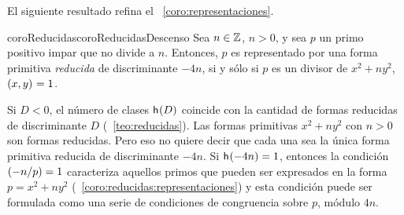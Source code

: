 El siguiente resultado refina el \coroname~\ref{coro:representaciones}.

\begin{restatable}{coroReducidas}{coroReducidasDescenso}
	\label{coro:reducidas:representaciones}
	Sea $n\in\mathbb{Z}$, $n>0$, y sea $p$ un primo positivo impar
	que no divide a $n$. Entonces, $p$ es representado por una
	forma primitiva \emph{reducida} de discriminante $-4n$,
	si y s\'olo si $p$ es un divisor de $x^2+ny^2$, $\left({x,y}\right)_{}=1$.
\end{restatable}


\begin{obsReducidas}\label{obs:reducidas}
	Si $D<0$, el n\'umero de clases $\mathsf{h}_{}(D)$ coincide
	con la cantidad de formas reducidas de discriminante $D$
	(\teoname~\ref{teo:reducidas}).
	Las formas primitivas $x^2+ny^2$ con $n>0$ son formas
	reducidas. Pero eso no quiere decir que cada una sea la
	\'unica forma primitiva reducida de discriminante $-4n$.
	Si $\mathsf{h}_{}(-4n)=1$, entonces la condici\'on
	$\left({-n}/{p}\right)=1$ caracteriza aquellos primos que
	pueden ser expresados en la forma $p=x^2+ny^2$
	(\coroname~\ref{coro:reducidas:representaciones})
	y esta condici\'on puede ser formulada como una serie de
	condiciones de congruencia sobre $p$, m\'odulo $4n$.
\end{obsReducidas}

